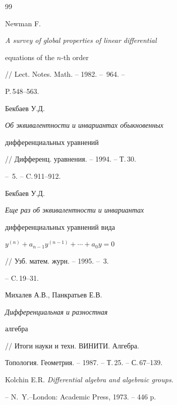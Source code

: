 \begin{thebibliography}{99}


Newman F. {\em A survey of global properties of linear differential


equations of the $n$-th order}


// Lect. Notes. Math. -- 1982. -- \No\,964. -- 


P.\,548--563. 




Бекбаев У.Д. {\em Об эквивалентности и инвариантах обыкновенных


дифференциальных уравнений}


// Дифференц. уравнения. -- 1994. -- Т.\,30. 


-- \No\,5. -- C.\,911--912. 




Бекбаев У.Д. {\em Еще раз об эквивалентности и инвариантах


дифференциальных уравнений вида


$y^{(n)}+a_{n-1}y^{(n-1)}+\dotsb+a_0y=0$}


// Узб. матем. журн. -- 1995. -- \No\,3. 


-- C.\,19--31. 




Михалев А.В., Панкратьев Е.В. {\em Дифференциальная и разностная


алгебра} // Итоги науки и техн. ВИНИТИ. Алгебра. 


Топология. Геометрия. -- 1987. -- Т.\,25. -- С.\,67--139.  




Kolchin E.R. {\em Differential algebra and algebraic groups}. 


-- N.~Y.--London: Academic Press, 1973. -- 446 p. 


 


\end{thebibliography} 


 


\vskip 2cm 


 






\label{end} 


 


 


